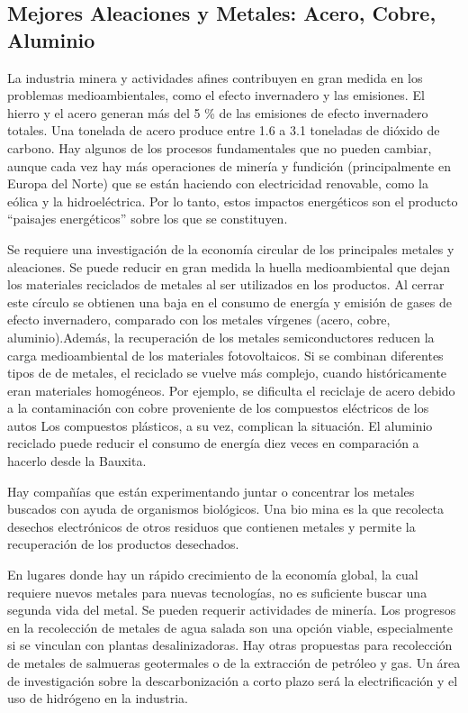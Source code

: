 \documentclass[runningheads]{llncs}
\begin{document}
\subsection{Mejores Aleaciones y Metales: Acero, Cobre, Aluminio}
La industria minera y actividades afines contribuyen en gran medida en los problemas medioambientales, como el efecto invernadero y las emisiones. El hierro y el acero generan más del 5 \% de las emisiones de efecto invernadero totales. Una tonelada de acero produce entre 1.6 a 3.1 toneladas de dióxido de carbono. Hay algunos de los procesos fundamentales que no pueden cambiar, aunque cada vez hay más operaciones de minería y fundición (principalmente en Europa del Norte) que se están haciendo con electricidad renovable, como la eólica y la hidroeléctrica. Por lo tanto, estos impactos energéticos son el producto “paisajes energéticos” sobre los que se constituyen.

Se requiere una investigación de la economía circular de los principales metales y aleaciones. Se puede reducir en gran medida la huella medioambiental que dejan los materiales reciclados de metales al ser utilizados en los productos. Al cerrar este círculo se obtienen una baja en el consumo de energía y emisión de gases de efecto invernadero, comparado con los metales vírgenes (acero, cobre, aluminio).Además, la recuperación de los metales semiconductores reducen la carga medioambiental de los materiales fotovoltaicos. Si se combinan diferentes tipos de de metales, el reciclado se vuelve más complejo, cuando históricamente eran materiales homogéneos. Por ejemplo, se dificulta el reciclaje de acero debido a la contaminación con cobre proveniente de los compuestos eléctricos de los autos Los compuestos plásticos, a su vez, complican la situación. El aluminio reciclado puede reducir el consumo de energía diez veces en comparación a hacerlo desde la Bauxita.

Hay compañías que están experimentando juntar o concentrar los metales buscados con ayuda de organismos biológicos. Una bio mina es la que recolecta desechos electrónicos de otros residuos que contienen metales y permite la recuperación de los productos desechados.

En lugares donde hay un rápido crecimiento de la economía global, la cual requiere nuevos metales para nuevas tecnologías, no es suficiente buscar una segunda vida del metal. Se pueden requerir actividades de minería. Los progresos en la recolección de metales de agua salada son una opción viable, especialmente si se vinculan con plantas desalinizadoras. Hay otras propuestas para recolección de metales de salmueras geotermales o de la extracción de petróleo y gas. Un área de investigación sobre la descarbonización a corto plazo será la electrificación y el uso de hidrógeno en la industria.
\end{document}
